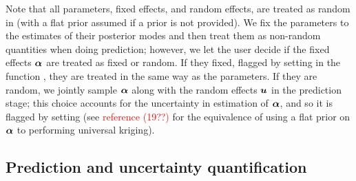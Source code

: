 \documentclass[nojss]{jss}
\newcommand{\red}[1]{\textcolor{red}{#1}}
\newcommand{\fct}[1]{\code{#1()}}
\def\mbf#1{{%
\mathchoice%
{\hbox{\boldmath$\displaystyle{#1}$}}%
{\hbox{\boldmath$\textstyle{#1}$}}%
{\hbox{\boldmath$\scriptstyle{#1}$}}%
{\hbox{\boldmath$\scriptscriptstyle{#1}$}}%
}}
\def\vec{\mbf}
\newcommand{\Gau}{{\text{Gau}}}
\newcommand{\ENoLR}[1]{\mathbb{E}(#1)} %
\newcommand{\precisionNoLR}[1]{{\rm prec}(#1)} %
\begin{document}
Note that all parameters, fixed effects, and random effects, are treated as random in  (with a flat prior assumed if a prior is not provided).
We fix the parameters to the estimates of their posterior modes and then treat them as non-random quantities when doing prediction; however, we let the user decide if the fixed effects $\vec{\alpha}$ are treated as fixed or random. 
If they fixed, flagged by setting  in the function \fct{predict}, they are treated in the same way as the parameters. 
If they are random, we jointly sample $\vec{\alpha}$ along with the random effects $\vec{u}$ in the prediction stage;  this choice accounts for the uncertainty in estimation of $\vec{\alpha}$, and so it is flagged by setting  (see \red{reference (19??)} for the equivalence of using a flat prior on $\vec{\alpha}$ to performing universal kriging). 





\subsection{Prediction and uncertainty quantification}\label{subsection:04-03:Prediction}
\end{document}

